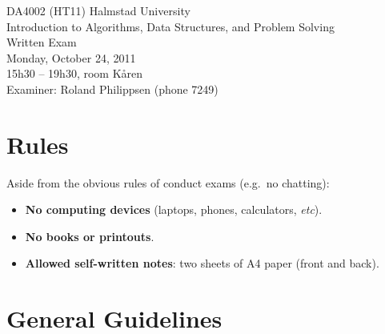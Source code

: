 \documentclass[a4paper]{article}
\begin{document}
\pagestyle{empty}
\thispagestyle{empty}



\noindent
\begin{minipage}{\columnwidth}
  \centering
  \Large
  DA4002 (HT11) Halmstad University\\
  Introduction to Algorithms, Data Structures, and Problem Solving\\[3\baselineskip]
  \Huge
  Written Exam\\
  \Large
  Monday, October 24, 2011\\
  15h30 -- 19h30, room K{\aa}ren\\[2\baselineskip]
  Examiner: Roland Philippsen (phone 7249)
\end{minipage}

\vfill

\noindent
\begin{center}
\end{center}

\vfill



\section*{Rules}

Aside from the obvious rules of conduct exams (e.g.\ no chatting):

\begin{itemize}
\item
  \textbf{No computing devices} (laptops, phones, calculators, \emph{etc}).
\item
  \textbf{No books or printouts}.
\item
  \textbf{Allowed self-written notes}: two sheets of A4 paper (front and back).
\end{itemize}



\section*{General Guidelines}
\end{document}
